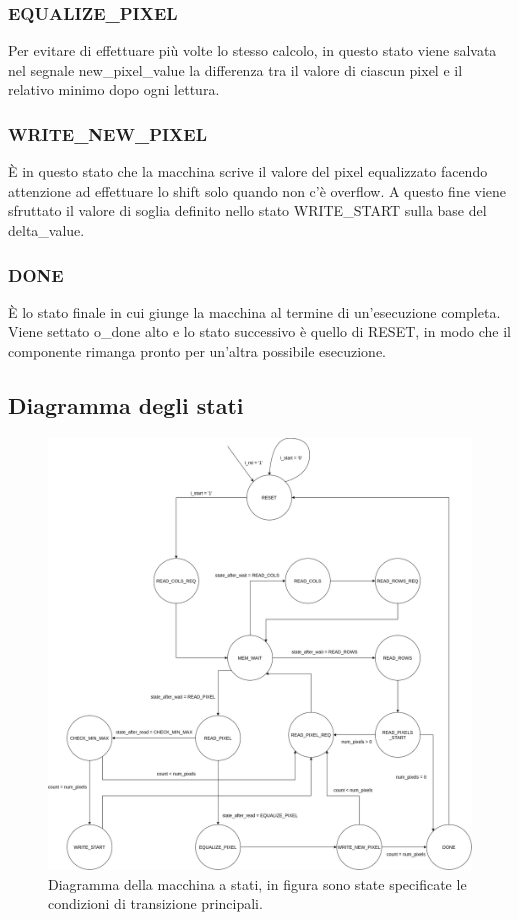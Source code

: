 \documentclass{article}
\begin{document}
\subsubsection{EQUALIZE\_PIXEL}
Per evitare di effettuare più volte lo stesso calcolo, in questo stato viene salvata nel segnale new\_pixel\_value la differenza tra il valore di ciascun pixel e il relativo minimo dopo ogni lettura.

\subsubsection{WRITE\_NEW\_PIXEL}
È in questo stato che la macchina scrive il valore del pixel equalizzato facendo attenzione ad effettuare lo shift solo quando non c'è overflow. A questo fine viene sfruttato il valore di soglia definito nello stato WRITE\_START sulla base del delta\_value.

\subsubsection{DONE}
È lo stato finale in cui giunge la macchina al termine di un'esecuzione completa. Viene settato o\_done alto e lo stato successivo è quello di RESET, in modo che il componente rimanga pronto per un'altra possibile esecuzione.

\subsection{Diagramma degli stati}

\begin{figure}[h]
    \includegraphics[width=\textwidth]{diagram.png}
    \centering
    \caption{Diagramma della macchina a stati, in figura sono state specificate le condizioni di transizione principali.}
\end{figure}
\end{document}
